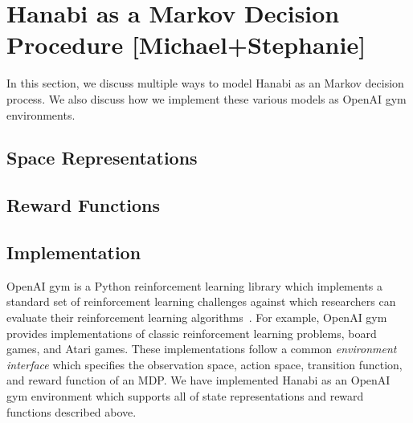 \section{Hanabi as a Markov Decision Procedure [Michael+Stephanie]}\label{sec:hanabimdp}

In this section, we discuss multiple ways to model Hanabi as an Markov decision
process. We also discuss how we implement these various models as OpenAI gym
environments.

\subsection{Space Representations}

\subsection{Reward Functions}

\subsection{Implementation}
OpenAI gym is a Python reinforcement learning library which implements a
standard set of reinforcement learning challenges against which researchers can
evaluate their reinforcement learning algorithms~\cite{brockman2016openai}. For
example, OpenAI gym provides implementations of classic reinforcement learning
problems, board games, and Atari games. These implementations follow a common
\emph{environment interface} which specifies the observation space, action
space, transition function, and reward function of an MDP. We have implemented
Hanabi as an OpenAI gym environment which supports all of state representations
and reward functions described above.

